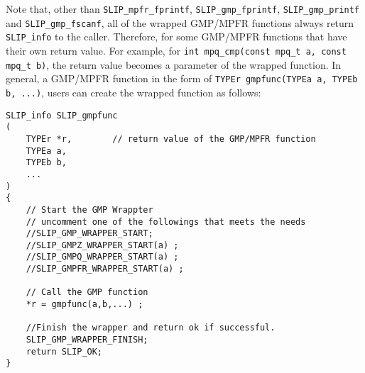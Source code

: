 \documentclass[12pt]{article}
\theoremstyle{definition}
\begin{document}
Note that, other than \verb|SLIP_mpfr_fprintf|, \verb|SLIP_gmp_fprintf|,
\verb|SLIP_gmp_printf| and \verb|SLIP_gmp_fscanf|, all of the wrapped GMP/MPFR
functions always return \verb|SLIP_info| to the caller. Therefore, for some
GMP/MPFR functions that have their own return value.  For example, for
\verb|int mpq_cmp(const mpq_t a, const mpq_t b)|, the return value becomes a
parameter of the wrapped function. In general, a GMP/MPFR function in the form
of \verb|TYPEr gmpfunc(TYPEa a, TYPEb b, ...)|, users can create the wrapped
function as follows:

\begin{mdframed}[userdefinedwidth=6in]
{\footnotesize
\begin{verbatim}
SLIP_info SLIP_gmpfunc
(
    TYPEr *r,        // return value of the GMP/MPFR function
    TYPEa a,
    TYPEb b,
    ...
)
{
    // Start the GMP Wrappter
    // uncomment one of the followings that meets the needs
    //SLIP_GMP_WRAPPER_START;
    //SLIP_GMPZ_WRAPPER_START(a) ;
    //SLIP_GMPQ_WRAPPER_START(a) ;
    //SLIP_GMPFR_WRAPPER_START(a) ;

    // Call the GMP function
    *r = gmpfunc(a,b,...) ;

    //Finish the wrapper and return ok if successful.
    SLIP_GMP_WRAPPER_FINISH;
    return SLIP_OK;
}
\end{verbatim}
} \end{mdframed}
\end{document}
